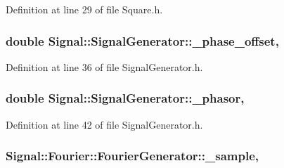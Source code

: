 Definition at line 29 of file Square.\+h.

\hypertarget{classSignal_1_1SignalGenerator_a6b4444d46747c8517171edbbf4b5588f}{
\subsubsection[{\+\_\+phase\+\_\+offset}]{\setlength{\rightskip}{0pt plus 5cm}double Signal\+::\+Signal\+Generator\+::\+\_\+phase\+\_\+offset\hspace{0.3cm}{\ttfamily [protected]}, {\ttfamily [inherited]}}}\label{classSignal_1_1SignalGenerator_a6b4444d46747c8517171edbbf4b5588f}


Definition at line 36 of file Signal\+Generator.\+h.

\hypertarget{classSignal_1_1SignalGenerator_af4aa0728ded00777be26a06d883eaeb3}{
\subsubsection[{\+\_\+phasor}]{\setlength{\rightskip}{0pt plus 5cm}double Signal\+::\+Signal\+Generator\+::\+\_\+phasor\hspace{0.3cm}{\ttfamily [protected]}, {\ttfamily [inherited]}}}\label{classSignal_1_1SignalGenerator_af4aa0728ded00777be26a06d883eaeb3}


Definition at line 42 of file Signal\+Generator.\+h.

\hypertarget{classSignal_1_1Fourier_1_1FourierGenerator_ad720bf2b268dc621ace64c54c0816597}{
\subsubsection[{\+\_\+sample}]{ Signal\+::\+Fourier\+::\+Fourier\+Generator\+::\+\_\+sample\hspace{0.3cm}{\ttfamily [protected]}, {\ttfamily [inherited]}}}\label{classSignal_1_1Fourier_1_1FourierGenerator_ad720bf2b268dc621ace64c54c0816597}


